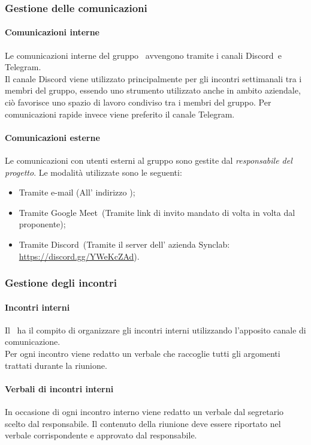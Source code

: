     \subsubsection{Gestione delle comunicazioni}
      \paragraph{Comunicazioni interne}
       Le comunicazioni interne del gruppo \groupName\ avvengono tramite i canali Discord\glo\ e Telegram\glo.\\
       Il canale Discord viene utilizzato principalmente per gli incontri settimanali tra i membri del gruppo, essendo uno strumento utilizzato anche in ambito aziendale, ciò favorisce uno spazio di lavoro condiviso tra i membri del gruppo.
       Per comunicazioni rapide invece viene preferito il canale Telegram.
      
      \paragraph{Comunicazioni esterne}
      Le comunicazioni con utenti esterni al gruppo sono gestite dal \textit{responsabile del progetto}. Le modalità utilizzate sono le seguenti:
      \begin {itemize}
        \item Tramite e-mail (All' indirizzo \groupEmail);
        \item Tramite Google Meet\glo\ (Tramite link di invito mandato di volta in volta dal proponente);
        \item Tramite Discord\glo\ (Tramite il server dell' azienda Synclab: \url{https://discord.gg/YWeKcZAd}).
      \end {itemize}

    \subsubsection{Gestione degli incontri}
      \paragraph{Incontri interni}
        Il \roleProjectManager\ ha il compito di organizzare gli incontri interni utilizzando l'apposito canale di comunicazione.\\
        Per ogni incontro viene redatto un verbale che raccoglie tutti gli argomenti trattati durante la riunione.
      \paragraph {Verbali di incontri interni}
      In occasione di ogni incontro interno viene redatto un verbale dal segretario scelto dal responsabile. Il contenuto della riunione deve essere riportato nel verbale corrispondente e approvato dal responsabile.

